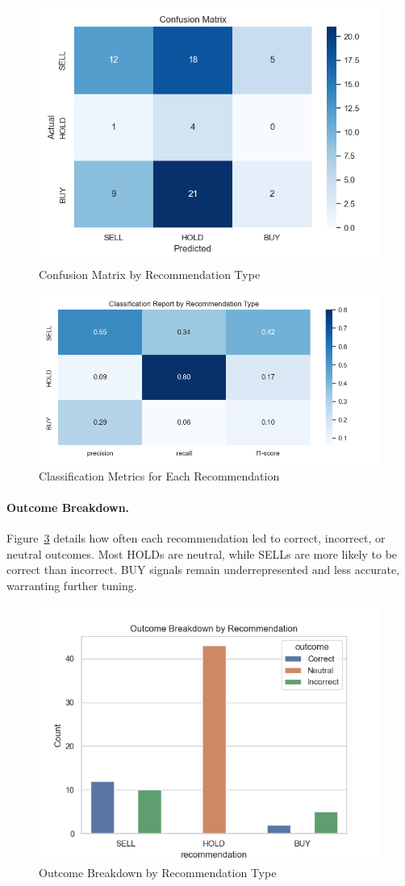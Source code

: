 \begin{figure}[h]
  \centering
  \includegraphics[width=0.6\linewidth]{assets/confusion_matrix.png}
  \caption{Confusion Matrix by Recommendation Type}
  \label{fig:conf_mat}
\end{figure}

\begin{figure}[h]
  \centering
  \includegraphics[width=0.6\linewidth]{assets/classification_report_by_recommendation.png}
  \caption{Classification Metrics for Each Recommendation}
  \label{fig:class_report}
\end{figure}

\FloatBarrier

\paragraph{Outcome Breakdown.}  
Figure~\ref{fig:outcome_breakdown} details how often each recommendation led to correct, incorrect, or neutral outcomes. Most HOLDs are neutral, while SELLs are more likely to be correct than incorrect. BUY signals remain underrepresented and less accurate, warranting further tuning.

\begin{figure}[h]
  \centering
  \includegraphics[width=0.6\linewidth]{assets/outcome_breakdown_by_recommendation.png}
  \caption{Outcome Breakdown by Recommendation Type}
  \label{fig:outcome_breakdown}
\end{figure}

